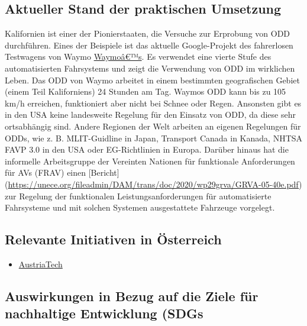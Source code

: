 \documentclass[
]{book}
\providecommand{\tightlist}{%
  \setlength{\itemsep}{0pt}\setlength{\parskip}{0pt}}
\begin{document}
\hypertarget{aktueller-stand-der-praktischen-umsetzung-1}{%
\subsection*{Aktueller Stand der praktischen Umsetzung}\label{aktueller-stand-der-praktischen-umsetzung-1}}

Kalifornien ist einer der Pionierstaaten, die Versuche zur Erprobung von ODD durchführen. Eines der Beispiele ist das aktuelle Google-Projekt des fahrerlosen Testwagens von Waymo \href{https://www.losaltoshills.ca.gov/DocumentCenter/View/2315/Waymo_Driverless_Autonomous_Vehicle_Tester_Program}{Waymoâ€™s}. Es verwendet eine vierte Stufe des automatisierten Fahrsystems und zeigt die Verwendung von ODD im wirklichen Leben. Das ODD von Waymo arbeitet in einem bestimmten geografischen Gebiet (einem Teil Kaliforniens) 24 Stunden am Tag. Waymos ODD kann bis zu 105 km/h erreichen, funktioniert aber nicht bei Schnee oder Regen. Ansonsten gibt es in den USA keine landesweite Regelung für den Einsatz von ODD, da diese sehr ortsabhängig sind. Andere Regionen der Welt arbeiten an eigenen Regelungen für ODDs, wie z. B. MLIT-Guidline in Japan, Transport Canada in Kanada, NHTSA FAVP 3.0 in den USA oder EG-Richtlinien in Europa. Darüber hinaus hat die informelle Arbeitsgruppe der Vereinten Nationen für funktionale Anforderungen für AVs (FRAV) einen {[}Bericht{]} (\url{https://unece.org/fileadmin/DAM/trans/doc/2020/wp29grva/GRVA-05-40e.pdf}) zur Regelung der funktionalen Leistungsanforderungen für automatisierte Fahrsysteme und mit solchen Systemen ausgestattete Fahrzeuge vorgelegt.

\hypertarget{relevante-initiativen-in-uxf6sterreich-1}{%
\subsection*{Relevante Initiativen in Österreich}\label{relevante-initiativen-in-uxf6sterreich-1}}

\begin{itemize}
\tightlist
\item
  \href{https://austriatech.at/de/das-konzept-der-isad-klassen/}{AustriaTech}
\end{itemize}

\hypertarget{auswirkungen-in-bezug-auf-die-ziele-fuxfcr-nachhaltige-entwicklung-sdgs-1}{%
\subsection*{Auswirkungen in Bezug auf die Ziele für nachhaltige Entwicklung (SDGs}\label{auswirkungen-in-bezug-auf-die-ziele-fuxfcr-nachhaltige-entwicklung-sdgs-1}}
\end{document}
